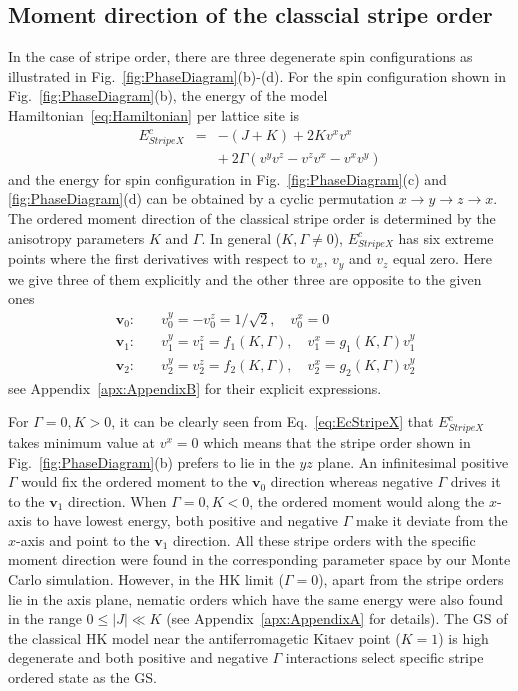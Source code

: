 \documentclass[aps,prb,reprint,amsfonts,amsmath,amssymb,showpacs,groupedaddress,superscriptaddress]{revtex4-1}
\begin{document}
\subsection{\label{sec:SectionIIIB}Moment direction of the classcial stripe order}
In the case of stripe order, there are three degenerate spin configurations as illustrated in Fig.~\ref{fig:PhaseDiagram}(b)-(d). For the spin configuration shown in Fig.~\ref{fig:PhaseDiagram}(b), the energy of the model Hamiltonian~\eqref{eq:Hamiltonian} per lattice site is
\begin{eqnarray}
    E_{StripeX}^{c} & = & -(J + K) + 2 K v^x v^x \nonumber \\
        & & +\: 2 \Gamma (v^y v^z - v^z v^x - v^x v^y) \label{eq:EcStripeX}
\end{eqnarray}
and the energy for spin configuration in Fig.~\ref{fig:PhaseDiagram}(c) and \ref{fig:PhaseDiagram}(d) can be obtained by a cyclic permutation $x \rightarrow y \rightarrow z \rightarrow x$. The ordered moment direction of the classical stripe order is determined by the anisotropy parameters $K$ and $\Gamma$. In general ($K,\Gamma \neq 0$), $E_{StripeX}^{c}$ has six extreme points where the first derivatives with respect to $v_x$, $v_y$ and $v_z$ equal zero. Here we give three of them explicitly and the other three are opposite to the given ones
\begin{subequations}
    \label{eq:whole}
    \begin{eqnarray}
        & \bm{v}_0:& \quad v_{0}^{y}=-v_{0}^{z} = 1/\sqrt{2}, \quad v_{0}^{x} = 0 \label{eq:v0} \\
        & \bm{v}_1:& \quad v_{1}^{y}=v_{1}^{z} = f_{1}(K, \Gamma), \quad v_{1}^{x} = g_{1}(K, \Gamma) v_{1}^{y} \label{eq:v1} \\
        & \bm{v}_2:& \quad v_{2}^{y}=v_{2}^{z} = f_{2}(K, \Gamma), \quad v_{2}^{x} = g_{2}(K, \Gamma) v_{2}^{y} \label{eq:v2}
    \end{eqnarray}
\end{subequations}
see Appendix~\ref{apx:AppendixB} for their explicit expressions.

For $\Gamma=0, K>0$, it can be clearly seen from Eq.~\eqref{eq:EcStripeX} that $E_{StripeX}^{c}$ takes minimum value at $v^x = 0$ which means that the stripe order shown in Fig.~\ref{fig:PhaseDiagram}(b) prefers to lie in the $yz$ plane. An infinitesimal positive $\Gamma$ would fix the ordered moment to the $\bm{v}_0$ direction whereas negative $\Gamma$ drives it to the $\bm{v}_1$ direction. When $\Gamma=0, K<0$, the ordered moment would along the $x$-axis to have lowest energy, both positive and negative $\Gamma$ make it deviate from the $x$-axis and point to the $\bm{v}_1$ direction. All these stripe orders with the specific moment direction were found in the corresponding parameter space by our Monte Carlo simulation. However, in the HK limit ($\Gamma=0$), apart from the stripe orders lie in the axis plane, nematic orders which have the same energy were also found in the range $0 \leq |J| \ll K$ (see Appendix~\ref{apx:AppendixA} for details). The GS of the classical HK model near the antiferromagetic Kitaev point ($K=1$) is high degenerate and both positive and negative $\Gamma$ interactions select specific stripe ordered state as the GS.
\end{document}
